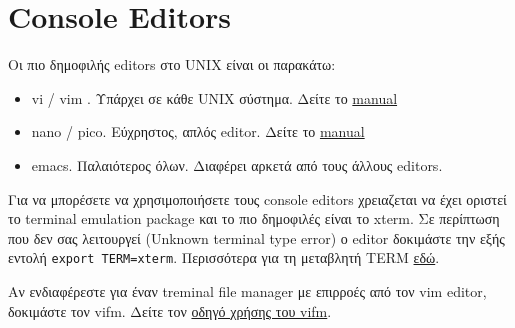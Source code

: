 







\section{Console Editors}
Οι πιο δημοφιλής editors στο UNIX είναι οι παρακάτω:
\begin{itemize}
	\item vi / vim \cite{Neil:2015}. Υπάρχει σε κάθε UNIX σύστημα. Δείτε το \href{https://www.cs.colostate.edu/helpdocs/vi.html}{manual}
	\item nano / pico. Εύχρηστος, απλός editor. Δείτε το \href{http://documentation.its.umich.edu/node/241}{manual}
	\item emacs. Παλαιότερος όλων. Διαφέρει αρκετά από τους άλλους editors.
\end{itemize}

Για να μπορέσετε να χρησιμοποιήσετε τους console editors χρειαζεται να έχει οριστεί το terminal emulation package και το πιο δημοφιλές είναι το xterm. Σε περίπτωση που δεν σας λειτουργεί (Unknown terminal type error) ο editor δοκιμάστε την εξής εντολή \texttt{export TERM=xterm}. Περισσότερα για τη μεταβλητή TERM  \href{http://jdebp.eu./Softwares/nosh/guide/TERM.html}{εδώ}.

\begin{tcolorbox}[frogbox, title=vifm]
	Αν ενδιαφέρεστε για έναν treminal file manager με επιρροές από τον vim editor, δοκιμάστε τον vifm. Δείτε τον  \href{https://wiki.vifm.info/index.php/Quickstart_Tutorial}{οδηγό χρήσης του vifm}.
\end{tcolorbox}

